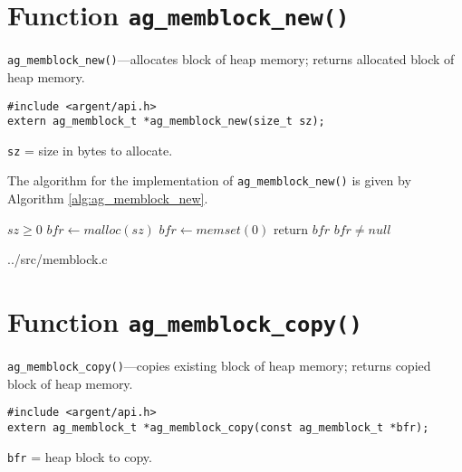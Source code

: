 %

\section{Function \texttt{ag\_memblock\_new()}}

\begin{noteblock}
\small
\verb|ag_memblock_new()|---allocates block of heap memory; returns allocated
block of heap memory.
\lstset{style=SYNOPSIS}
\begin{lstlisting}[linewidth=1.0\linewidth]
#include <argent/api.h>
extern ag_memblock_t *ag_memblock_new(size_t sz);
\end{lstlisting}
\verb|sz| = size in bytes to allocate.
\end{noteblock}

The algorithm for the implementation of \verb|ag_memblock_new()| is given by
Algorithm \ref{alg:ag_memblock_new}.

\begin{WrapText}

\begin{algorithm}
\caption{\texttt{ag\_memblock\_new()}}
\label{alg:ag_memblock_new}
\begin{algorithmic}
\Require $sz \geq 0$
\State $bfr \gets malloc(sz)$
\State $bfr \gets memset(0)$
\State return $bfr$
\EndProcedure
\Ensure $bfr \neq null$
\end{algorithmic}
\end{algorithm}

\end{WrapText}

\lstset{style=CODE}

  {../src/memblock.c}

%


\section{Function \texttt{ag\_memblock\_copy()}}

\begin{noteblock}
\small
\verb|ag_memblock_copy()|---copies existing block of heap memory; returns copied
block of heap memory.
\lstset{style=SYNOPSIS}
\begin{lstlisting}[linewidth=1.0\linewidth]
#include <argent/api.h>
extern ag_memblock_t *ag_memblock_copy(const ag_memblock_t *bfr);
\end{lstlisting}
\verb|bfr| = heap block to copy.
\end{noteblock}

